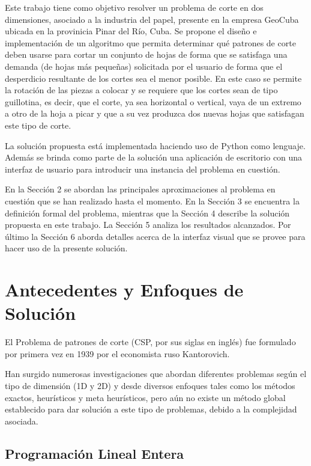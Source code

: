 \documentclass[a4paper,10pt,twocolumn]{article}
\begin{document}
Este trabajo tiene como objetivo resolver un problema de corte en dos dimensiones, asociado a la industria del papel, presente en la empresa GeoCuba ubicada en la provinicia Pinar del Río, Cuba. Se propone el  diseño e implementación de un algoritmo que permita determinar qué patrones de corte deben usarse para cortar un conjunto de hojas de forma que se satisfaga una demanda (de hojas más pequeñas) solicitada por el usuario de forma que el desperdicio resultante de los cortes sea el menor posible. En este caso se permite la rotación de las piezas a colocar y se requiere que los cortes sean de tipo guillotina, es decir, que  el corte, ya sea horizontal o vertical, vaya de un extremo a otro de la hoja a picar y que a su vez produzca dos nuevas hojas que satisfagan este tipo de corte. 

La solución propuesta está implementada haciendo uso de Python como lenguaje. Además se brinda como parte de la solución una aplicación de escritorio con una interfaz de usuario para introducir una instancia del problema en cuestión. 

En la Sección 2 se abordan las principales aproximaciones al problema en cuestión que se han realizado hasta el momento. En la Sección 3 se encuentra la definición formal del problema, mientras que la Sección 4 describe la solución propuesta en este trabajo. La Sección 5 analiza los resultados alcanzados. Por último la Sección 6 aborda detalles acerca de la interfaz visual que se provee para hacer uso de la presente solución.


\section{Antecedentes y Enfoques de Solución}
El Problema de patrones de corte (CSP, por sus siglas
en inglés) fue formulado por primera vez en 1939
por el economista ruso Kantorovich.

Han surgido numerosas investigaciones que abordan
diferentes problemas según el tipo de dimensión (1D y
2D) y desde diversos enfoques tales como los métodos
exactos, heurísticos y meta heurísticos, pero aún no
existe un método global establecido para dar solución
a este tipo de problemas, debido a la complejidad
asociada. 

\subsection{Programación Lineal Entera}
\end{document}
